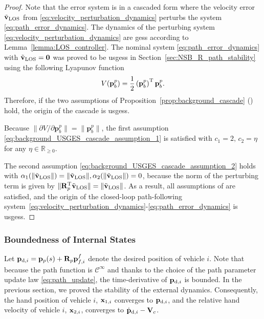 \begin{proof}
    Note that the error system is in a cascaded form where the velocity error $\Tilde{\mathbf{v}}_{\rm LOS}$ from \eqref{eq:velocity_perturbation_dynamics} perturbs the system \eqref{eq:path_error_dynamics}. The dynamics of the perturbing system \eqref{eq:velocity_perturbation_dynamics} are \glspl{ges} according to Lemma~\ref{lemma:LOS_controller}. The nominal system \eqref{eq:path_error_dynamics} with $\Tilde{\mathbf{v}}_{\rm LOS}=\mathbf{0}$ was proved to be \glspl{usges} in Section~\ref{sec:NSB_R_path_stability} using the following Lyapunov function
\begin{equation}
    V(\mathbf{p}_b^p) = \frac{1}{2}\left(\mathbf{p}_b^p\right)^{\mathrm{T}}\mathbf{p}_b^p.
\end{equation}
Therefore, if the two assumptions of Proposition~\ref{prop:background_cascade} (\cite[Proposition 9]{pettersen_lyapunov_2017}) hold, the origin of the cascade is \glspl{usges}.

Because $\|\partial V/\partial \mathbf{p}_b^p\| = \|\mathbf{p}_b^p\|$, the first assumption \eqref{eq:background_USGES_cascade_assumption_1} is satisfied with $c_1 = 2, \, c_2 = \eta$ for any $\eta \in \mathbb{R}_{\geq 0}$.

The second assumption \eqref{eq:background_USGES_cascade_assumption_2} holds with $\alpha_1(\|\Tilde{\mathbf{v}}_{\rm LOS}\|) = \|\Tilde{\mathbf{v}}_{\rm LOS}\|, \alpha_2(\|\Tilde{\mathbf{v}}_{\rm LOS}\|) = 0$, because the norm of the perturbing term is given by $\|\mathbf{R}_p^{\mathrm{T}} \Tilde{\mathbf{v}}_{\rm LOS}\| = \|\Tilde{\mathbf{v}}_{\rm LOS}\|$. As a result, all assumptions of \cite[Proposition 9]{pettersen_lyapunov_2017} are satisfied, and the origin of the closed-loop path-following system~\eqref{eq:velocity_perturbation_dynamics}-\eqref{eq:path_error_dynamics} is \glspl{usges}.
\end{proof}


\subsubsection{Boundedness of Internal States}
Let $\mathbf{p}_{{\rm d}, i} = \mathbf{p}_p(s) + \mathbf{R}_p\mathbf{p}_{f, i}^f$ denote the desired position of vehicle $i$. Note that because the path function is $\mathcal{C}^{\infty}$ and thanks to the choice of the path parameter update law \eqref{eq:path_update}, the time-derivative of $\mathbf{p}_{{\rm d}, i}$ is bounded.
In the previous section, we proved the stability of the external dynamics.
Consequently, the hand position of vehicle $i$, $\mathbf{x}_{1, i}$ converges to $\mathbf{p}_{{\rm d}, i}$, and the relative hand velocity of vehicle $i$, $\mathbf{x}_{2, i}$, converges to $\dot{\mathbf{p}}_{{\rm d}, i} - \mathbf{V}_c$.

